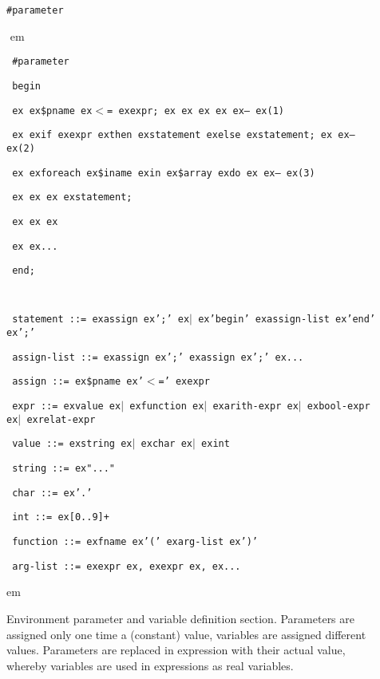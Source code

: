 \documentclass[a4paper,12pt,twoside,english]{article}
\def\s{\hskip 1.15 ex}
\begin{document}
\def\thesubsection{\tocCII}
\secII{\label{toclabelCII}\thesubsection}
\begin{description}
\item[] $ $\\
{\tt \#parameter}

\item[]
\def\prefskipu{}\def\prefskipo{}\def\prefskipa{}\def\prefskipu{\hskip10pt}\def\prefskipo{\hskip10pt}\def\prefskipa{\hskip20pt}\def\content{
\vskip-5pt{\parindent0pt\parbox{\linewidth}{\tt\smallsize\hskip10pt \#parameter}}
\vskip-5pt{\parindent0pt\parbox{\linewidth}{\tt\smallsize\hskip10pt begin}}
\vskip-5pt{\parindent0pt\parbox{\linewidth}{\tt\smallsize\hskip10pt \s \s \$pname\s $<$=\s expr;\s \s \s \s \s --\s (1)}}
\vskip-5pt{\parindent0pt\parbox{\linewidth}{\tt\smallsize\hskip10pt \s \s if\s expr\s then\s statement\s else\s statement;\s \s --\s (2)}}
\vskip-5pt{\parindent0pt\parbox{\linewidth}{\tt\smallsize\hskip10pt \s \s foreach\s \$iname\s in\s \$array\s do\s \s --\s (3)}}
\vskip-5pt{\parindent0pt\parbox{\linewidth}{\tt\smallsize\hskip10pt \s \s \s \s statement;}}
\vskip-5pt{\parindent0pt\parbox{\linewidth}{\tt\smallsize\hskip10pt \s \s \s }}
\vskip-5pt{\parindent0pt\parbox{\linewidth}{\tt\smallsize\hskip10pt \s \s ...}}
\vskip-5pt{\parindent0pt\parbox{\linewidth}{\tt\smallsize\hskip10pt end;}}
\vskip-5pt{\parindent0pt\parbox{\linewidth}{\tt\smallsize\hskip10pt }}
\vskip-5pt{\parindent0pt\parbox{\linewidth}{\tt\smallsize\hskip10pt statement~::=\s assign\s ';'\s $|$\s 'begin'\s assign-list\s 'end'\s ';'}}
\vskip-5pt{\parindent0pt\parbox{\linewidth}{\tt\smallsize\hskip10pt assign-list~::=\s assign\s ';'\s assign\s ';'\s ...}}
\vskip-5pt{\parindent0pt\parbox{\linewidth}{\tt\smallsize\hskip10pt assign~::=\s \$pname\s '$<$='\s expr}}
\vskip-5pt{\parindent0pt\parbox{\linewidth}{\tt\smallsize\hskip10pt expr~::=\s value\s $|$\s function\s $|$\s arith-expr\s $|$\s bool-expr\s $|$\s relat-expr}}
\vskip-5pt{\parindent0pt\parbox{\linewidth}{\tt\smallsize\hskip10pt value~::=\s string\s $|$\s char\s $|$\s int}}
\vskip-5pt{\parindent0pt\parbox{\linewidth}{\tt\smallsize\hskip10pt string~::=\s "..."}}
\vskip-5pt{\parindent0pt\parbox{\linewidth}{\tt\smallsize\hskip10pt char~::=\s '.'}}
\vskip-5pt{\parindent0pt\parbox{\linewidth}{\tt\smallsize\hskip10pt int~::=\s {[}0..9{]}+}}
\vskip-5pt{\parindent0pt\parbox{\linewidth}{\tt\smallsize\hskip10pt function~::=\s fname\s '('\s arg-list\s ')'}}
\vskip-5pt{\parindent0pt\parbox{\linewidth}{\tt\smallsize\hskip10pt arg-list~::=\s expr\s ,\s expr\s ,\s ...}}
}
$ $
 em
\content
{} em
\item[] $ $\\
Environment parameter and variable definition section. Parameters are assigned only one time a (constant) value, variables are assigned different values.
Parameters are replaced in expression with their actual value, whereby variables are used in expressions as real variables.


\end{description}
\end{document}
